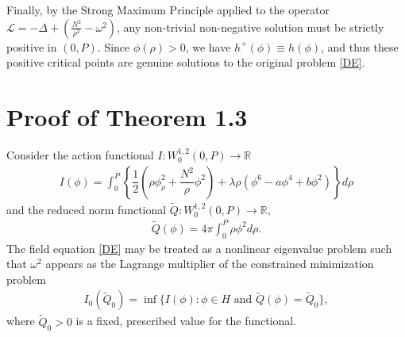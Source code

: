 \documentclass[12pt]{article}
\begin{document}
Finally, by the Strong Maximum Principle applied to the operator $\mathcal{L} = -\Delta + (\frac{N^2}{\rho^2} - \omega^2)$, any non-trivial non-negative solution must be strictly positive in $(0, P)$. Since $\phi(\rho) > 0$, we have $h^+(\phi) \equiv h(\phi)$, and thus these positive critical points are genuine solutions to the original problem \eqref{DE}.
	
	\section{Proof of Theorem 1.3}
	\setcounter{equation}{0}
	Consider the action functional $I:W_0^{1,2}(0,P)\rightarrow\mathbb{R}$
	\begin{align}
		I(\phi)=\int_0^{P}\left\{\dfrac{1}{2}\left(\rho\phi_{\rho}^2+\dfrac{N^2}{\rho}\phi^2\right)+\lambda\rho(\phi^6-a\phi^4+b\phi^2)\right\}d\rho\label{action}
	\end{align}
	and the reduced norm functional $\tilde{Q}:W_0^{1,2}(0,P)\rightarrow\mathbb{R}$,
	\begin{align}
		\tilde{Q}(\phi)=4\pi\int_0^{P}\rho\phi^2d\rho.\label{constraint}
	\end{align}
	The field equation \eqref{DE} may be treated as a nonlinear eigenvalue problem such that $\omega^2$ appears as the Lagrange multiplier of the constrained minimization problem
	\begin{align}
		I_0(\tilde{Q}_0)=\inf\{I(\phi) : \phi \in H \text{ and } \tilde{Q}(\phi)=\tilde{Q}_0\}, \label{minimization}
	\end{align}
	where $\tilde{Q}_0 > 0$ is a fixed, prescribed value for the functional.
	
\end{document}
